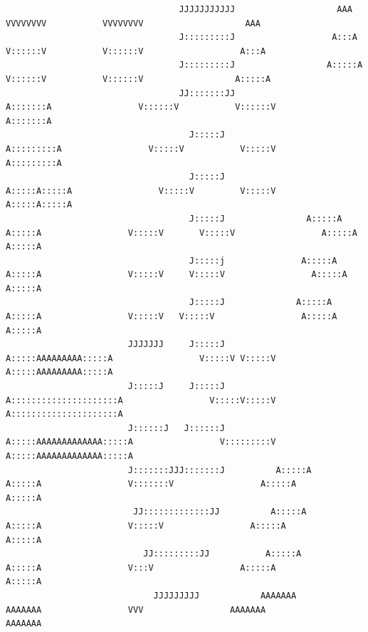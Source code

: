 \documentclass[openany]{book}  %
\begin{document}
\begin{titlepage}
\begin{center}
{\begin{verbatim}
                                  JJJJJJJJJJJ                    AAA                    VVVVVVVV           VVVVVVVV                    AAA               
                                  J:::::::::J                   A:::A                   V::::::V           V::::::V                   A:::A              
                                  J:::::::::J                  A:::::A                  V::::::V           V::::::V                  A:::::A             
                                  JJ:::::::JJ                 A:::::::A                 V::::::V           V::::::V                 A:::::::A            
                                    J:::::J                  A:::::::::A                 V:::::V           V:::::V                 A:::::::::A           
                                    J:::::J                 A:::::A:::::A                 V:::::V         V:::::V                 A:::::A:::::A          
                                    J:::::J                A:::::A A:::::A                 V:::::V       V:::::V                 A:::::A A:::::A         
                                    J:::::j               A:::::A   A:::::A                 V:::::V     V:::::V                 A:::::A   A:::::A        
                                    J:::::J              A:::::A     A:::::A                 V:::::V   V:::::V                 A:::::A     A:::::A       
                        JJJJJJJ     J:::::J             A:::::AAAAAAAAA:::::A                 V:::::V V:::::V                 A:::::AAAAAAAAA:::::A      
                        J:::::J     J:::::J            A:::::::::::::::::::::A                 V:::::V:::::V                 A:::::::::::::::::::::A     
                        J::::::J   J::::::J           A:::::AAAAAAAAAAAAA:::::A                 V:::::::::V                 A:::::AAAAAAAAAAAAA:::::A    
                        J:::::::JJJ:::::::J          A:::::A             A:::::A                 V:::::::V                 A:::::A             A:::::A   
                         JJ:::::::::::::JJ          A:::::A               A:::::A                 V:::::V                 A:::::A               A:::::A  
                           JJ:::::::::JJ           A:::::A                 A:::::A                 V:::V                 A:::::A                 A:::::A 
                             JJJJJJJJJ            AAAAAAA                   AAAAAAA                 VVV                 AAAAAAA                   AAAAAAA
                                                                                                                                                 

\end{verbatim}}
\end{center}
\end{titlepage}
\end{document}
